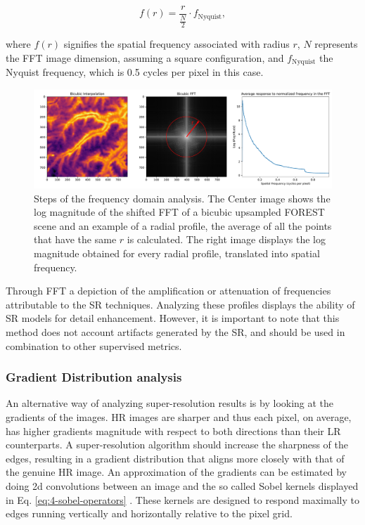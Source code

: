         \begin{equation}
            f(r) = \frac{r}{\frac{N}{2}} \cdot f_{\text{Nyquist}},
        \end{equation}

        where \( f(r) \) signifies the spatial frequency associated with radius \( r \), \( N \) represents the FFT image dimension, assuming a square configuration, and \( f_{\text{Nyquist}} \) the Nyquist frequency, which is 0.5 cycles per pixel in this case.

        \begin{figure}[H]
            \centering
            \includegraphics[width=\linewidth]{Includes/4-frequency-analysis.pdf}
            \caption{Steps of the frequency domain analysis. The Center image shows the log magnitude of the shifted FFT of a bicubic upsampled FOREST scene and an example of a radial profile, the average of all the points that have the same $r$ is calculated. The right image displays the log magnitude obtained for every radial profile, translated into spatial frequency.  }
            \label{fig:4-frequency-analysis}
        \end{figure}

        Through FFT a depiction of the amplification or attenuation of frequencies attributable to the SR techniques. 
        Analyzing these profiles displays the ability of SR models for detail enhancement. 
        However, it is important to note that this method does not account artifacts generated by the SR, and should be used in combination to other supervised metrics.

        \subsubsection{Gradient Distribution analysis}


        An alternative way of analyzing super-resolution results is by looking at the gradients of the images. 
        HR images are sharper and thus each pixel, on average, has higher gradients magnitude with respect to both directions than their LR counterparts.
        A super-resolution algorithm should increase the sharpness of the edges, resulting in a gradient distribution that aligns more closely with that of the genuine HR image.
        An approximation of the gradients can be estimated by doing 2d convolutions between an image and the so called Sobel kernels displayed in Eq. \ref{eq:4-sobel-operators} \cite{Sobel1990AnI3}.
        These kernels are designed to respond maximally to edges running vertically and horizontally relative to the pixel grid.
        
